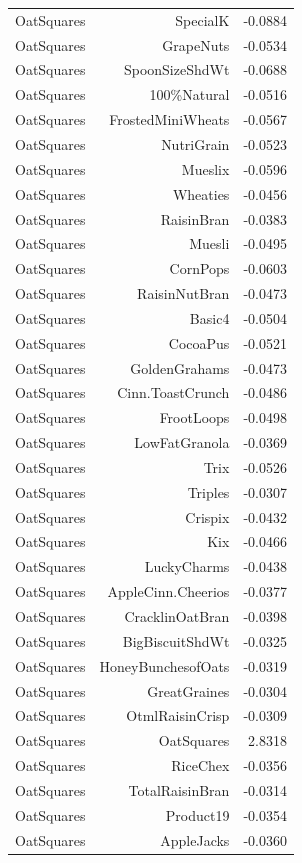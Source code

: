 \begin{longtable}{@{}lrr@{}}
OatSquares & SpecialK & -0.0884 \\
OatSquares & GrapeNuts & -0.0534 \\
OatSquares & SpoonSizeShdWt & -0.0688 \\
OatSquares & 100\%Natural & -0.0516 \\
OatSquares & FrostedMiniWheats & -0.0567 \\
OatSquares & NutriGrain & -0.0523 \\
OatSquares & Mueslix & -0.0596 \\
OatSquares & Wheaties & -0.0456 \\
OatSquares & RaisinBran & -0.0383 \\
OatSquares & Muesli & -0.0495 \\
OatSquares & CornPops & -0.0603 \\
OatSquares & RaisinNutBran & -0.0473 \\
OatSquares & Basic4 & -0.0504 \\
OatSquares & CocoaPus & -0.0521 \\
OatSquares & GoldenGrahams & -0.0473 \\
OatSquares & Cinn.ToastCrunch & -0.0486 \\
OatSquares & FrootLoops & -0.0498 \\
OatSquares & LowFatGranola & -0.0369 \\
OatSquares & Trix & -0.0526 \\
OatSquares & Triples & -0.0307 \\
OatSquares & Crispix & -0.0432 \\
OatSquares & Kix & -0.0466 \\
OatSquares & LuckyCharms & -0.0438 \\
OatSquares & AppleCinn.Cheerios & -0.0377 \\
OatSquares & CracklinOatBran & -0.0398 \\
OatSquares & BigBiscuitShdWt & -0.0325 \\
OatSquares & HoneyBunchesofOats & -0.0319 \\
OatSquares & GreatGraines & -0.0304 \\
OatSquares & OtmlRaisinCrisp & -0.0309 \\
OatSquares & OatSquares & 2.8318 \\
OatSquares & RiceChex & -0.0356 \\
OatSquares & TotalRaisinBran & -0.0314 \\
OatSquares & Product19 & -0.0354 \\
OatSquares & AppleJacks & -0.0360 \\

\end{longtable}
